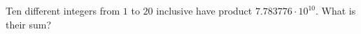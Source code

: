 Ten different integers from $1$ to $20$ inclusive have product $7.783776\cdot10^{10}$. What is their sum?
